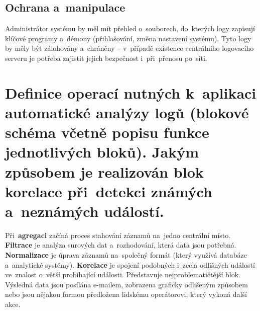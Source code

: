 \subsection{Ochrana a~manipulace}

Administrátor systému by měl mít přehled o~souborech, do~kterých logy zapisují klíčové programy a~démony (přihlašování, změna nastavení systému). Tyto logy by měly být zálohovány a~chráněny -- v~případě existence centrálního logovacího serveru je potřeba zajistit jejich bezpečnost i~při~přenosu po~síti.

\clearpage
\section{Definice operací nutných k~aplikaci automatické analýzy logů (blokové schéma včetně popisu funkce jednotlivých bloků). Jakým způsobem je realizován blok korelace při~detekci známých a~neznámých událostí.}

\begin{figure}
\end{figure}

Při~\textbf{agregaci} začíná proces stahování záznamů na~jedno centrální místo. \textbf{Filtrace} je analýza surových dat a~rozhodování, která data jsou potřebná. \textbf{Normalizace} je úprava záznamů na~společný formát (který využívá databáze a~analytické systémy). \textbf{Korelace} je spojení podobných i~zcela odlišných událostí ve~znalost o~větší probíhající události. Představuje nejproblematičtější blok. Výsledná data jsou posílána e-mailem, zobrazena graficky odlišeným způsobem nebo jsou nějakou formou předložena lidskému operátorovi, který vykoná další akce.

